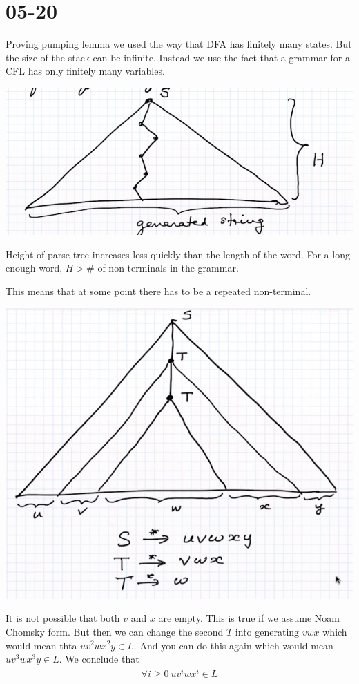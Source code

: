 \documentclass[../598comp.tex]{subfiles}
\date{05-20}
\begin{document}
\section{05-20}

Proving pumping lemma we used the way that DFA has finitely many states. But the
size of the stack can be infinite. Instead we use the fact that a grammar for a
CFL has only finitely many variables.

\includegraphics[width=\textwidth]{parse_tree_example}

Height of parse tree increases less quickly than the length of the word. For a
long enough word, $H > \#$ of non terminals in the grammar.

This means that at some point there has to be a repeated non-terminal.

\includegraphics[width=\textwidth/4*3]{parse_tree_example2}

It is not possible that both $v$ and $x$ are empty. This is true if we assume
Noam Chomsky form. But then we can change the second $T$ into generating $vwx$
which would mean thta $uv^2wx^2y \in L$. And you can do this again
which would mean $uv^3wx^3y \in L$. We conclude that
\begin{gather*}
  \forall i \geq 0 \ uv^iwx^i \in L
\end{gather*}
\end{document}

